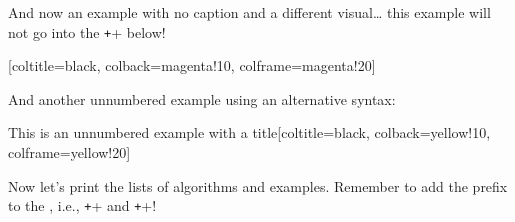 \documentclass{article}
\begin{document}
And now an example with no caption and a different visual…  this example will not go into the \texttt+\listofexamples+ below!

\begin{cthexample}{}[coltitle=black, colback=magenta!10, colframe=magenta!20]
  \emph{\kant[4]}
\end{cthexample}

And another unnumbered example using an alternative syntax:


\begin{cthexample*}{This is an unnumbered example with a title}[coltitle=black, colback=yellow!10, colframe=yellow!20]
  \emph{\kant[4]}
\end{cthexample*}

Now let's print the lists of algorithms and examples. Remember to add the prefix  to the , i.e., \texttt+\cthlistofalgorithms+ and \texttt+\cthlistofexamples+!

\cthlistofalgorithms

\cthlistofexamples
\end{document}
